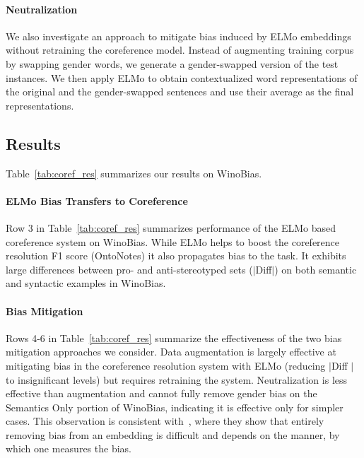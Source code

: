 \documentclass[11pt,a4paper]{article}
\begin{document}
\paragraph{Neutralization}
We also investigate an approach to mitigate bias induced by ELMo embeddings without retraining the coreference model.
Instead of augmenting training corpus by swapping gender words, we generate a gender-swapped version of the test instances.
We then apply ELMo to obtain contextualized word representations of the original and the gender-swapped sentences and use their average as the final representations.

\subsection{Results}
Table~\ref{tab:coref_res} summarizes our results on WinoBias.
\paragraph{ELMo Bias Transfers to Coreference}
Row 3 in Table~\ref{tab:coref_res} summarizes performance of the ELMo based coreference system on WinoBias.
While ELMo helps to boost the coreference resolution F1 score (OntoNotes) it also propagates bias to the task.
It exhibits large differences between pro- and anti-stereotyped sets ($\mid$Diff$\mid$) on both semantic and syntactic examples in WinoBias.

\paragraph{Bias Mitigation}
Rows 4-6 in Table~\ref{tab:coref_res} summarize the effectiveness of the two bias mitigation approaches we consider.
Data augmentation is largely effective at mitigating bias in the coreference resolution system with ELMo (reducing $\mid$Diff $\mid$ to insignificant levels) but requires retraining the system.
Neutralization is less effective than augmentation and cannot fully remove gender bias on the Semantics Only portion of WinoBias, indicating it is effective only for simpler cases.
This observation is consistent with~, where they show that entirely removing bias from an embedding is difficult and depends on the manner, by which one measures the bias.
\end{document}
